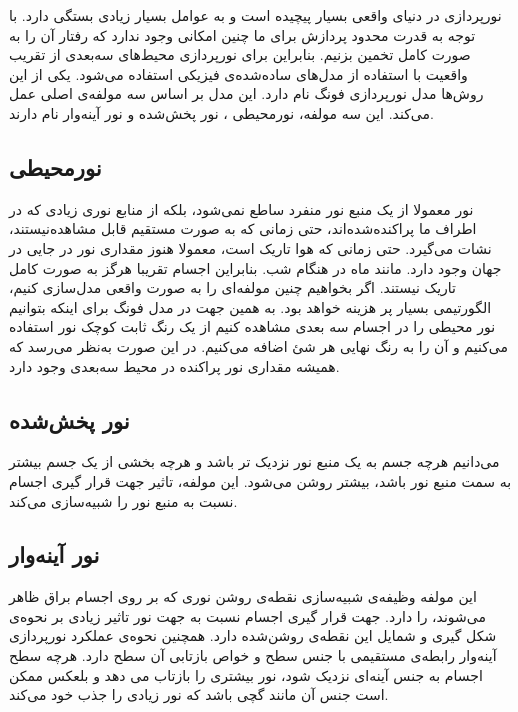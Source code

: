 نورپردازی در دنیای واقعی بسیار پیچیده است و
به عوامل بسیار زیادی بستگی دارد. با توجه به 
قدرت محدود پردازش برای ما چنین امکانی وجود ندارد که رفتار آن را 
به صورت کامل تخمین بزنیم.
بنابراین برای نورپردازی محیط‌های سه‌بعدی از تقریب‌ واقعیت 
با استفاده از مدل‌های ساده‌شده‌ی فیزیکی استفاده می‌شود.
یکی از این روش‌ها مدل نورپردازی فونگ نام دارد.
این مدل بر اساس سه مولفه‌ی اصلی عمل می‌کند.
این سه ‌مولفه، نورمحیطی
، نور پخش‌شده
و نور آینه‌وار
نام دارند.
\cite{LearnOpenGLPhongShading}
\subsection{نورمحیطی}

نور معمولا از یک منبع نور منفرد ساطع نمی‌شود، بلکه
از منابع نوری زیادی که در اطراف ما پراکنده‌شده‌اند،
حتی زمانی که به صورت مستقیم قابل مشاهده‌نیستند،
نشات می‌گیرد.
حتی زمانی که هوا تاریک است، معمولا هنوز مقداری 
نور در جایی در جهان وجود دارد.
مانند ماه در هنگام شب.
بنابراین اجسام تقریبا هرگز به صورت کامل 
تاریک نیستند.
اگر بخواهیم چنین مولفه‌ای را به صورت واقعی مدل‌سازی کنیم، 
الگورتیمی بسیار پر هزینه خواهد بود.
به همین جهت در مدل فونگ برای اینکه بتوانیم نور محیطی را 
در اجسام سه بعدی مشاهده کنیم 
از یک رنگ ثابت کوچک نور استفاده می‌کنیم و آن را به 
رنگ نهایی هر شئ اضافه می‌کنیم.
در این صورت به‌نظر می‌رسد که همیشه مقداری نور پراکنده در محیط 
سه‌بعدی وجود دارد.
\cite{LearnOpenGLPhongShading}
\subsection{نور پخش‌شده}

می‌دانیم هرچه جسم به یک منبع نور نزدیک تر باشد و هرچه 
بخشی از یک جسم بیشتر به سمت منبع نور باشد، بیشتر روشن می‌شود.
این مولفه، تاثیر جهت قرار گیری 
اجسام نسبت به منبع نور را شبیه‌سازی می‌کند.
\cite{LearnOpenGLPhongShading}
\subsection{نور آینه‌وار}

این مولفه وظیفه‌ی شبیه‌سازی نقطه‌ی روشن نوری که 
بر روی اجسام براق ظاهر می‌شوند، را دارد.
جهت قرار گیری اجسام نسبت به جهت نور 
تاثیر زیادی بر نحوه‌ی شکل گیری و شمایل این 
نقطه‌ی روشن‌شده دارد.
همچنین نحوه‌ی عملکرد نورپردازی آینه‌وار رابطه‌ی مستقیمی با 
 جنس سطح و خواص بازتابی آن سطح دارد.
هرچه سطح اجسام به جنس آینه‌ای نزدیک شود، نور بیشتری را بازتاب می دهد 
و بلعکس ممکن است جنس آن مانند گچی باشد که نور زیادی را جذب خود می‌کند.
\cite{LearnOpenGLPhongShading}

